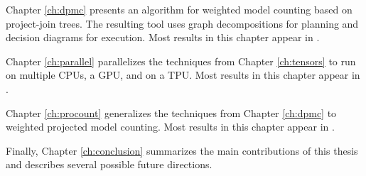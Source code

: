 Chapter \ref{ch:dpmc} presents an algorithm for weighted model counting based on project-join trees. The resulting tool  uses graph decompositions for planning and decision diagrams for execution. Most results in this chapter appear in \cite{dudek2020dpmc}.

Chapter \ref{ch:parallel} parallelizes the techniques from Chapter \ref{ch:tensors} to run on multiple CPUs, a GPU, and on a TPU. Most results in this chapter appear in \cite{dudek2020parallel}.

Chapter \ref{ch:procount} generalizes the techniques from Chapter \ref{ch:dpmc} to weighted projected model counting. Most results in this chapter appear in \cite{dudek2020procount}.

Finally, Chapter \ref{ch:conclusion} summarizes the main contributions of this thesis and describes several possible future directions.